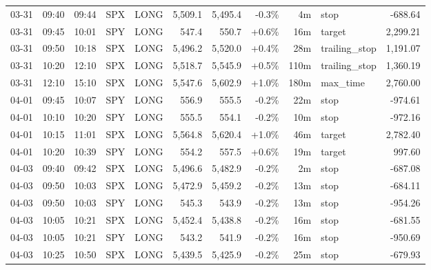\documentclass[11pt,a4paper,twoside]{article}
\begin{document}
\begin{center}
\begin{longtable}{>{\color{txtmain}}l l l l l r r r r >{\color{txtmain}}l r}
03-31 & 09:40 & 09:44 & SPX & LONG & 5,509.1 & 5,495.4 & \textcolor{lossred}{-0.3\%} & 4m & stop & \textcolor{lossred}{-688.64} \\
03-31 & 09:45 & 10:01 & SPY & LONG & 547.4 & 550.7 & \textcolor{wingreen}{+0.6\%} & 16m & target & \textcolor{wingreen}{2,299.21} \\
03-31 & 09:50 & 10:18 & SPX & LONG & 5,496.2 & 5,520.0 & \textcolor{wingreen}{+0.4\%} & 28m & trailing\_stop & \textcolor{wingreen}{1,191.07} \\
03-31 & 10:20 & 12:10 & SPX & LONG & 5,518.7 & 5,545.9 & \textcolor{wingreen}{+0.5\%} & 110m & trailing\_stop & \textcolor{wingreen}{1,360.19} \\
03-31 & 12:10 & 15:10 & SPX & LONG & 5,547.6 & 5,602.9 & \textcolor{wingreen}{+1.0\%} & 180m & max\_time & \textcolor{wingreen}{2,760.00} \\
04-01 & 09:45 & 10:07 & SPY & LONG & 556.9 & 555.5 & \textcolor{lossred}{-0.2\%} & 22m & stop & \textcolor{lossred}{-974.61} \\
04-01 & 10:10 & 10:20 & SPY & LONG & 555.5 & 554.1 & \textcolor{lossred}{-0.2\%} & 10m & stop & \textcolor{lossred}{-972.16} \\
04-01 & 10:15 & 11:01 & SPX & LONG & 5,564.8 & 5,620.4 & \textcolor{wingreen}{+1.0\%} & 46m & target & \textcolor{wingreen}{2,782.40} \\
04-01 & 10:20 & 10:39 & SPY & LONG & 554.2 & 557.5 & \textcolor{wingreen}{+0.6\%} & 19m & target & \textcolor{wingreen}{997.60} \\
04-03 & 09:40 & 09:42 & SPX & LONG & 5,496.6 & 5,482.9 & \textcolor{lossred}{-0.2\%} & 2m & stop & \textcolor{lossred}{-687.08} \\
04-03 & 09:50 & 10:03 & SPX & LONG & 5,472.9 & 5,459.2 & \textcolor{lossred}{-0.2\%} & 13m & stop & \textcolor{lossred}{-684.11} \\
04-03 & 09:50 & 10:03 & SPY & LONG & 545.3 & 543.9 & \textcolor{lossred}{-0.2\%} & 13m & stop & \textcolor{lossred}{-954.26} \\
04-03 & 10:05 & 10:21 & SPX & LONG & 5,452.4 & 5,438.8 & \textcolor{lossred}{-0.2\%} & 16m & stop & \textcolor{lossred}{-681.55} \\
04-03 & 10:05 & 10:21 & SPY & LONG & 543.2 & 541.9 & \textcolor{lossred}{-0.2\%} & 16m & stop & \textcolor{lossred}{-950.69} \\
04-03 & 10:25 & 10:50 & SPX & LONG & 5,439.5 & 5,425.9 & \textcolor{lossred}{-0.2\%} & 25m & stop & \textcolor{lossred}{-679.93} \\

\end{longtable}
\end{center}
\end{document}
